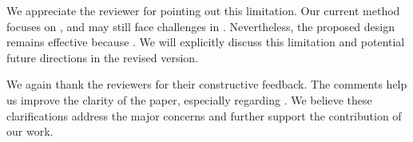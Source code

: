 

We appreciate the reviewer for pointing out this limitation.
Our current method focuses on , and may still face challenges in
.
Nevertheless, the proposed design remains effective because
.
We will explicitly discuss this limitation and potential future directions in the revised version.


We again thank the reviewers for their constructive feedback.
The comments help us improve the clarity of the paper, especially regarding
.
We believe these clarifications address the major concerns and further support the contribution of our work.